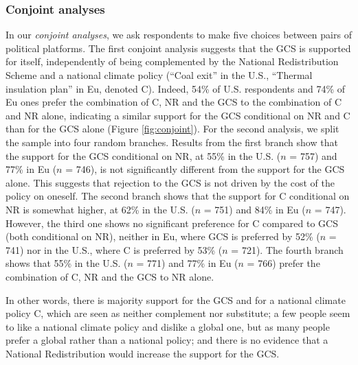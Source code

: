 \subsubsection{Conjoint analyses}\label{subsubsec:conjoint} %
In our \textit{conjoint analyses}, we ask respondents to make five choices between pairs of political platforms. The first conjoint analysis suggests that the GCS is supported for itself, independently of being complemented by the National Redistribution Scheme and a national climate policy (``Coal exit'' in the U.S., ``Thermal insulation plan'' in Eu, denoted C). Indeed, 54\% of %
U.S. respondents and 74\% of %
Eu ones prefer the combination of C, NR and the GCS to the combination of C and NR alone, indicating a similar support for the GCS conditional on NR and C than for the GCS alone (Figure \ref{fig:conjoint}). %
For the second analysis, we split the sample into four random branches. Results from the first branch show that the support for the GCS conditional on NR, at 55\% in the U.S. ($n$ = 757) and 77\% in Eu ($n$ = 746), is not significantly different from the support for the GCS alone. This suggests that rejection to the GCS is not driven by the cost of the policy on oneself. The second branch shows that the support for C conditional on NR is somewhat higher, at 62\% in the U.S. ($n$ = 751) and 84\% in Eu ($n$ = 747). However, the third one shows no significant preference for C compared to GCS (both conditional on NR), neither in Eu, where GCS is preferred by 52\% ($n$ = 741) nor in the U.S., where C is preferred by 53\% ($n$ = 721). The fourth branch shows that 55\% in the U.S. ($n$ = 771) and 77\% in Eu ($n$ = 766) prefer the combination of C, NR and the GCS to NR alone. %

In other words, there is majority support for the GCS and for a national climate policy C, which are seen as neither complement nor substitute; a few people seem to like a national climate policy and dislike a global one, but as many people prefer a global rather than a national policy; and there is no evidence that a National Redistribution would increase the support for the GCS. %

